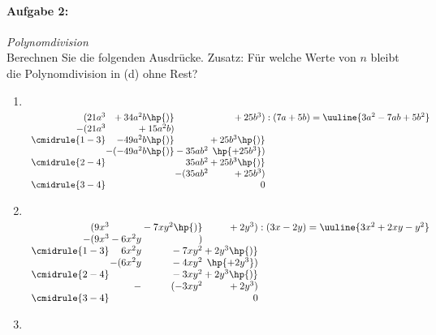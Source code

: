\paragraph{Aufgabe 2: } \emph{Polynomdivision}\\[0.2cm]
Berechnen Sie die folgenden Ausdrücke. Zusatz: Für welche Werte von $n$ bleibt die Polynomdivision in (d) ohne Rest?
\begin{enumerate}[label=(\alph*), labelindent=1em,labelsep=0.5cm]
    \item$~$\\[-1.3cm]
    \begin{align*}
        \begin{array}{r@{} r@{} r@{} r@{} r}
            (21a^3 &{}+34a^2b\hp{)}&{}&{}+25b^3) &\;:(7a+5b) = \uuline{3a^2-7ab+5b^2} \\
          -(21a^3 &{}+15a^2b) \\ 
          \cmidrule{1-3}
                & -49a^2 b\hp{)} &{}&{}+25b^3\hp{)}\\
                &-(-49a^2 b\hp{)}&{}-35ab^2&{}\hp{+25b^3}) \\
          \cmidrule{2-4}
                & &{}35ab^2&{}+25b^3\hp{)}\\
                & &-(35ab^2&{}+25b^3)\\
          \cmidrule{3-4} 
                & & & 0
        \end{array}
    \end{align*}
    \item$~$\\[-1.3cm]
    \begin{align*}
        \begin{array}{r@{} r@{} r@{} r@{} r}
            (9x^3 &{}&{}-7xy^2\hp{)}&{}+2y^3) &\;:(3x-2y) = \uuline{3x^2+2xy-y^2} \\
          -(9x^3 &{}-6x^2y&{}) \\ 
          \cmidrule{1-3}
                & 6x^2y &{} -7xy^2 &{}+2y^3\hp{)}\\
                &-(6x^2y&{} -4xy^2&{}\hp{+2y^3}) \\
          \cmidrule{2-4}
                & &{}-3xy^2&{}+2y^3\hp{)}\\
                & -&(-3xy^2&{}+2y^3)\\
          \cmidrule{3-4} 
                & & & 0
        \end{array}
    \end{align*}
    \item$~$\\[-1.3cm]

\end{enumerate}
